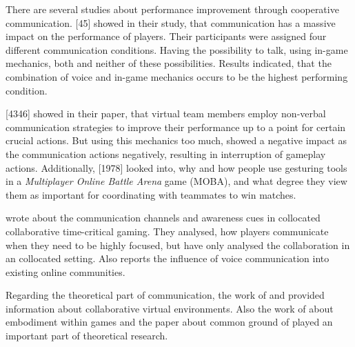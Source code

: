 There are several studies about performance improvement through cooperative communication.
\textcite{Vaddi2016Investigating2}[45] showed in their study, that communication has a massive impact on the performance of players. Their participants were assigned four different communication conditions. Having the possibility to talk, using in-game mechanics, both and neither of these possibilities.
Results indicated, that the combination of voice and in-game mechanics occurs to be the highest performing condition.

\textcite{Leavitt2016PingGames}[4346] showed in their paper, that virtual team members employ non-verbal communication strategies to improve their performance up to a point for certain crucial actions. But using this mechanics too much, showed a negative impact as the communication actions negatively, resulting in interruption of gameplay actions.
Additionally, \textcite{Wuertz2017Why2}[1978] looked into, why and how people use gesturing tools in a \textit{Multiplayer Online Battle Arena} game (MOBA), and what degree they view them as important for coordinating with teammates to win matches.

\textcite{Cheung2012CommunicationGaming} wrote about the communication channels and awareness cues in collocated collaborative time-critical gaming. They analysed, how players communicate when they need to be highly focused, but have only analysed the collaboration in an collocated setting.
Also \textcite{Williams2007CanCommunity} reports the influence of voice communication into existing online communities.

Regarding the theoretical part of communication, the work of \textcite{Benford2001CollaborativeEnvironments} and \textcite{Maher2011DesignersEnvironments} provided information about collaborative virtual environments.
Also the work of \textcite{Galantucci2012TheHumans} about embodiment within games and the paper about common ground of \textcite{Clark2004GroundingCommunication.} played an important part of theoretical research.